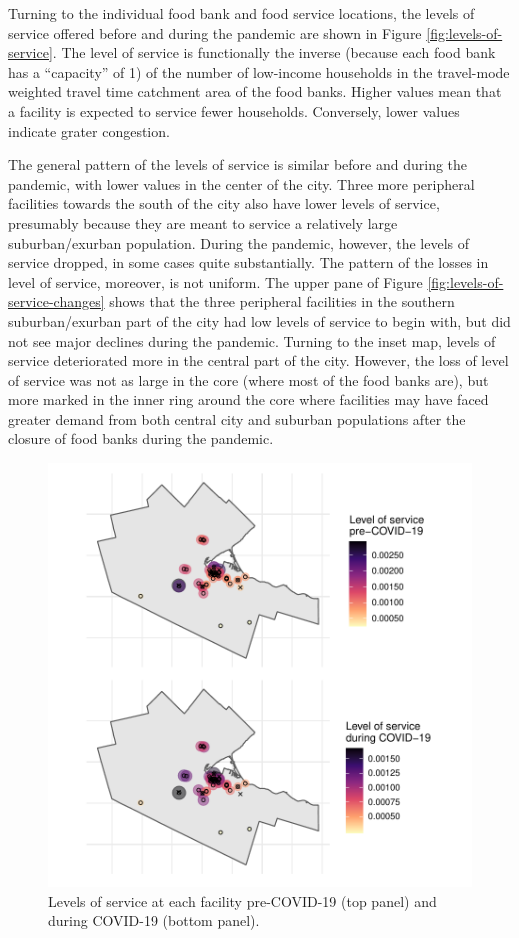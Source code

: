 \documentclass[]{elsarticle} %
\begin{document}
Turning to the individual food bank and food service locations, the
levels of service offered before and during the pandemic are shown in
Figure \ref{fig:levels-of-service}. The level of service is functionally
the inverse (because each food bank has a ``capacity'' of 1) of the
number of low-income households in the travel-mode weighted travel time
catchment area of the food banks. Higher values mean that a facility is
expected to service fewer households. Conversely, lower values indicate
grater congestion.

The general pattern of the levels of service is similar before and
during the pandemic, with lower values in the center of the city. Three
more peripheral facilities towards the south of the city also have lower
levels of service, presumably because they are meant to service a
relatively large suburban/exurban population. During the pandemic,
however, the levels of service dropped, in some cases quite
substantially. The pattern of the losses in level of service, moreover,
is not uniform. The upper pane of Figure
\ref{fig:levels-of-service-changes} shows that the three peripheral
facilities in the southern suburban/exurban part of the city had low
levels of service to begin with, but did not see major declines during
the pandemic. Turning to the inset map, levels of service deteriorated
more in the central part of the city. However, the loss of level of
service was not as large in the core (where most of the food banks are),
but more marked in the inner ring around the core where facilities may
have faced greater demand from both central city and suburban
populations after the closure of food banks during the pandemic.

\begin{figure}
\includegraphics[width=1\linewidth]{Accessibility-Foodbanks-Hamilton_files/figure-latex/plot-levels-of-service-1} \caption{\label{fig:levels-of-service}Levels of service at each facility pre-COVID-19 (top panel) and during COVID-19 (bottom panel).}\label{fig:plot-levels-of-service}
\end{figure}
\end{document}
